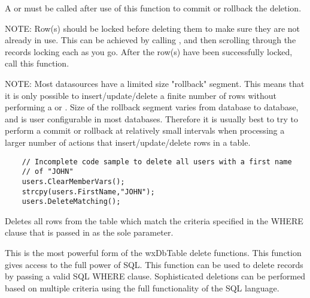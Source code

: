 A  or 
 must be called after use of 
this function to commit or rollback the deletion.

NOTE: Row(s) should be locked before deleting them to make sure they are 
not already in use.  This can be achieved by calling , 
and then scrolling through the records locking each as you go.  After the 
row(s) have been successfully locked, call this function.

NOTE: Most datasources have a limited size "rollback" segment.  This means 
that it is only possible to insert/update/delete a finite number of rows 
without performing a  or 
.  Size of the rollback 
segment varies from database to database, and is user configurable in 
most databases.  Therefore it is usually best to try to perform a commit 
or rollback at relatively small intervals when processing a larger number 
of actions that insert/update/delete rows in a table.



\begin{verbatim}
    // Incomplete code sample to delete all users with a first name
    // of "JOHN"
    users.ClearMemberVars();
    strcpy(users.FirstName,"JOHN");
    users.DeleteMatching();
\end{verbatim}


\label{wxdbtabledeletewhere}


Deletes all rows from the table which match the criteria specified in the 
WHERE clause that is passed in as the sole parameter.




This is the most powerful form of the wxDbTable delete functions.  This 
function gives access to the full power of SQL.  This function can be used 
to delete records by passing a valid SQL WHERE clause.  Sophisticated 
deletions can be performed based on multiple criteria using the full 
functionality of the SQL language.  

